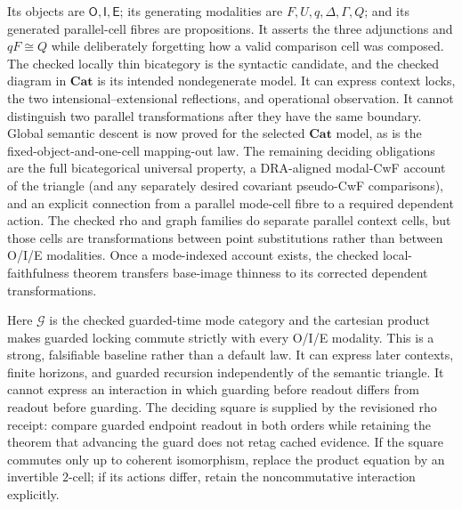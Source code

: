 \documentclass[11pt]{article}
\theoremstyle{definition}
\theoremstyle{remark}
\begin{document}
\begin{description}[style=nextline]
\item[Core locally thin triangle $\mathcal M_{\mathrm{OIE}}^{\leq}$.]
  Its objects are $\mathsf O,\mathsf I,\mathsf E$; its generating modalities
  are $F,U,q,\Delta,\Gamma,Q$; and its generated parallel-cell fibres are
  propositions.  It asserts the three adjunctions and $qF\cong Q$ while
  deliberately forgetting how a valid comparison cell was composed.  The
  checked locally thin bicategory is the syntactic candidate, and the checked
  diagram in $\mathbf{Cat}$ is its intended nondegenerate model.  It can express
  context locks, the two intensional--extensional reflections, and operational
  observation.  It cannot distinguish two parallel transformations after they
  have the same boundary.  Global semantic descent is now proved for the
  selected $\mathbf{Cat}$ model, as is the fixed-object-and-one-cell
  mapping-out law.  The remaining deciding obligations are the full
  bicategorical universal property, a DRA-aligned modal-CwF account of the
  triangle (and any separately desired covariant pseudo-CwF comparisons), and
  an explicit connection from a parallel mode-cell fibre to a required
  dependent action.  The checked rho and graph families do separate parallel
  context cells, but those cells are transformations between point
  substitutions rather than between O/I/E modalities.  Once a mode-indexed
  account exists, the
  checked local-faithfulness theorem transfers base-image thinness to its
  corrected dependent transformations.

\item[Strict guarded product
  $\mathcal M_{\mathrm{OIE}}^{\leq}\times\mathcal G$.]
  Here $\mathcal G$ is the checked guarded-time mode category and the cartesian
  product makes guarded locking commute strictly with every O/I/E modality.
  This is a strong, falsifiable baseline rather than a default law.  It can
  express later contexts, finite horizons, and guarded recursion independently
  of the semantic triangle.  It cannot express an interaction in which
  guarding before readout differs from readout before guarding.  The deciding
  square is supplied by the revisioned rho receipt: compare guarded endpoint
  readout in both orders while retaining the theorem that advancing the guard
  does not retag cached evidence.  If the square commutes only up to coherent
  isomorphism, replace the product equation by an invertible $2$-cell; if its
  actions differ, retain the noncommutative interaction explicitly.


\end{description}
\end{document}
